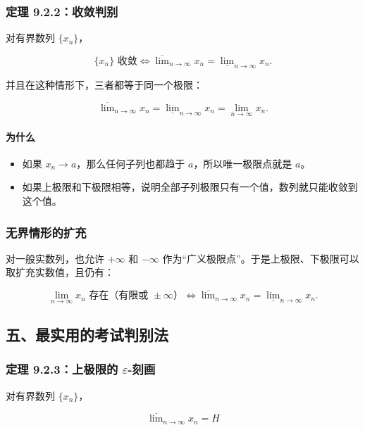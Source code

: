 \subsubsection*{定理 9.2.2：收敛判别}

对有界数列 \(\{x_n\}\)，

\[
      \{x_n\}\text{ 收敛}
      \iff
      \overline{\lim}_{n\to\infty}x_n
      =
      \underline{\lim}_{n\to\infty}x_n.
    \]

并且在这种情形下，三者都等于同一个极限：

\[
      \overline{\lim}_{n\to\infty}x_n
      =
      \underline{\lim}_{n\to\infty}x_n
      =
      \lim_{n\to\infty}x_n.
    \]

\paragraph*{为什么}

\begin{itemize}
 \item 如果 \(x_n\to a\)，那么任何子列也都趋于 \(a\)，所以唯一极限点就是 \(a\)。
 \item 如果上极限和下极限相等，说明全部子列极限只有一个值，数列就只能收敛到这个值。
 \end{itemize}

\subsubsection*{无界情形的扩充}

对一般实数列，也允许 \(+\infty\) 和 \(-\infty\) 作为“广义极限点”。于是上极限、下极限可以取扩充实数值，且仍有：

\[
      \lim_{n\to\infty}x_n \text{ 存在（有限或 } \pm\infty\text{）}
      \iff
      \overline{\lim}_{n\to\infty}x_n
      =
      \underline{\lim}_{n\to\infty}x_n.
    \]

\subsection*{五、最实用的考试判别法}

\subsubsection*{定理 9.2.3：上极限的 \(\varepsilon\)-刻画}

对有界数列 \(\{x_n\}\)，

\[
      \overline{\lim}_{n\to\infty}x_n=H
    \]

